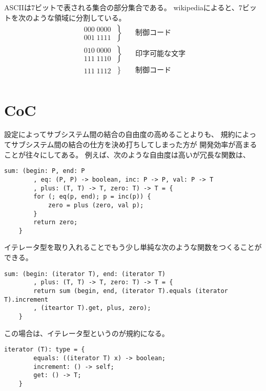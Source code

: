 {	ASCIIは$7$ビットで表される集合の部分集合である。
	wikipediaによると、$7$ビットを次のような領域に分割している。
	\begin{equation*}\begin{split}
		\left.\begin{split}
			000\;0000 \\
			001\;1111
		\end{split}\;\right\} & \quad\text{制御コード} \\
		\left.\begin{split}
			010\;0000 \\
			111\;1110
		\end{split}\;\right\} & \quad\text{印字可能な文字} \\
		\left.\begin{split}
			111\;1112
		\end{split}\;\right\} & \quad\text{制御コード} \\
	\end{split}\end{equation*}
\section{CoC}\label{s1:CoC} %
	設定によってサブシステム間の結合の自由度の高めることよりも、
	規約によってサブシステム間の結合の仕方を決め打ちしてしまった方が
	開発効率が高まることが往々にしてある。
	例えば、次のような自由度は高いが冗長な関数は、
	\begin{lstlisting}[caption=冗長な例, label=code:冗長な例]
	sum: (begin: P, end: P
		, eq: (P, P) -> boolean, inc: P -> P, val: P -> T
		, plus: (T, T) -> T, zero: T) -> T = {
		for (; eq(p, end); p = inc(p)) {
			zero = plus (zero, val p);
		}
		return zero;
	}
	\end{lstlisting}
	イテレータ型を取り入れることでもう少し単純な次のような関数をつくることが
	できる。
	\begin{lstlisting}[caption=単純化した例, label=code:単純化した例]
	sum: (begin: (iterator T), end: (iterator T)
		, plus: (T, T) -> T, zero: T) -> T = {
		return sum (begin, end, (iterator T).equals (iterator T).increment
		, (iteartor T).get, plus, zero);
	}
	\end{lstlisting}
	この場合は、イテレータ型というのが規約になる。
	\begin{lstlisting}[caption=イテレータ型, label=code:イテレータ型]
	iterator (T): type = {
		equals: ((iterator T) x) -> boolean;
		increment: () -> self;
		get: () -> T;
	}
	\end{lstlisting}
}\endgroup %
